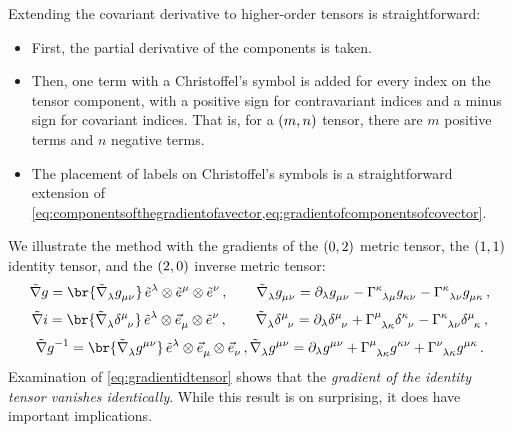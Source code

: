  Extending the covariant derivative to higher-order tensors is straightforward:
%
\begin{itemize}
  \item First, the partial derivative of the components is taken.
  \item Then, one term with a Christoffel's symbol is added for every index on the tensor component, with a positive sign for contravariant indices and a minus sign for covariant indices. That is, for a $\torder mn$ tensor, there are $m$ positive terms and $n$ negative terms.
  \item The placement of labels on Christoffel's symbols is a straightforward extension of \cref{eq:componentsofthegradientofavector,eq:gradientofcomponentsofcovector}.
\end{itemize}
%
 We illustrate the method with the gradients of the $\torder 02$ metric tensor, the $\torder 11$ identity tensor, and the $\torder 20$ inverse metric tensor:
%
\begin{equation}\label{eq:gradientmetric}
  \gradcov\metric = \br{\tgradcov\lambda\tmetric\mu\nu}\,\tbcov\lambda\tprod\tbcov\mu\tprod\tbcov\nu\,,\qquad
  \tgradcov\lambda\tmetric\mu\nu = \ipd\lambda\tmetric\mu\nu 
                                  - \tchris\kappa\lambda\mu\tmetric\kappa\nu 
                                  - \tchris\kappa\lambda\nu\tmetric\mu\kappa\,,
\end{equation}
%
\begin{equation}\label{eq:gradientidtensor}
  \gradcov\idtens = \br{\tgradcov\lambda\tkron\mu\nu}\,\tbcov\lambda\tprod\tbvec\mu\tprod\tbcov\nu\,,\qquad
  \tgradcov\lambda\tkron\mu\nu = \ipd\lambda\tkron\mu\nu 
                                + \tchris\mu\lambda\kappa\tkron\kappa\nu 
                                - \tchris\kappa\lambda\nu\tkron\mu\kappa\,,
\end{equation}
%
\begin{equation} \label{eq:gradientinvmetric}
  \gradcov\invmet = \br{\tgradcov\lambda\tinvmet\mu\nu}\,\tbcov\lambda\tprod\tbvec\mu\tprod\tbvec\nu\,,
  \tgradcov\lambda\tinvmet\mu\nu = \ipd\lambda\tinvmet\mu\nu 
                                  + \tchris\mu\lambda\kappa\tinvmet\kappa\nu
                                  + \tchris\nu\lambda\kappa\tinvmet\mu\kappa\,.
\end{equation}
%
 Examination of \cref{eq:gradientidtensor} shows that the \emph{gradient of the identity tensor vanishes identically}. While this result is on surprising, it does have important implications.

